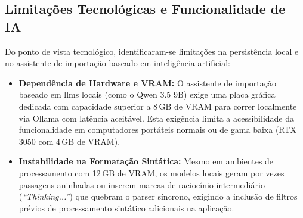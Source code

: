 \subsection{Limitações Tecnológicas e Funcionalidade de IA}
Do ponto de vista tecnológico, identificaram-se limitações na persistência local e no assistente de importação baseado em inteligência artificial:
\begin{itemize}
    \item \textbf{Dependência de Hardware e VRAM:} O assistente de importação baseado em \glspl{llm} locais (como o Qwen 3.5 9B) exige uma placa gráfica dedicada com capacidade superior a 8\,GB de VRAM para correr localmente via Ollama com latência aceitável. Esta exigência limita a acessibilidade da funcionalidade em computadores portáteis normais ou de gama baixa (RTX 3050 com 4\,GB de VRAM).
    \item \textbf{Instabilidade na Formatação Sintática:} Mesmo em ambientes de processamento com 12\,GB de VRAM, os modelos locais geram por vezes passagens aninhadas ou inserem marcas de raciocínio intermediário (\textit{``Thinking...''}) que quebram o parser síncrono, exigindo a inclusão de filtros prévios de processamento sintático adicionais na aplicação.
\end{itemize}

